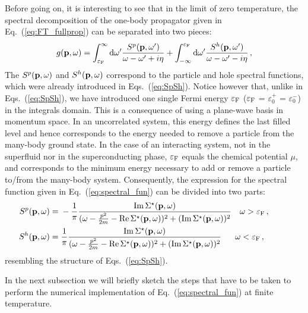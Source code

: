 Before going on, it is interesting to see that in the limit of zero temperature, the spectral decomposition of the one-body propagator given in Eq.~(\ref{eq:FT_fullprop}) can be separated into two pieces:
\begin{equation}
g({\bf p},\omega)=\int_{\varepsilon_\textrm F}^\infty\mathrm d\omega'\frac{S^p({\bf p},\omega')}{\omega-\omega'+i\eta}
+\int_{-\infty}^{\varepsilon_\textrm F}\mathrm d\omega'\frac{S^h({\bf p},\omega')}{\omega-\omega'-i\eta}\,,
\label{eq:Lehm_infty}
\end{equation}
The $S^p({\bf p},\omega)$ and $S^h({\bf p},\omega)$ correspond to the particle and hole spectral functions, which were already introduced in Eqs.~(\ref{eq:SpSh}). Notice however that, unlike in Eqs.~(\ref{eq:SpSh}), we have introduced one single Fermi energy $\varepsilon_\textrm F$ ($\varepsilon_\textrm F$ = $\varepsilon_0^+$ = $\varepsilon_0^-$) in the integrals domain. This is a consequence of using a plane-wave basis in momentum space. In an uncorrelated system, this energy defines the last filled level and hence corresponds to the energy needed to remove a particle from the many-body ground state. In the case of an interacting system, not in the superfluid nor in the superconducting phase, $\varepsilon_\textrm F$ equals the chemical potential $\mu$, and corresponds to the minimum energy necessary to add or remove a particle to/from the many-body system. Consequently, the expression for the spectral function given in Eq.~(\ref{eq:spectral_fun}) can be divided into two parts:
\begin{subequations}
\label{eq:S_self_all}
\begin{align}
S^p({\bf p},\omega)={}&-\frac{1}{\pi}\frac{\mathrm{Im} \, \Sigma^\star({\bf p},\omega)}
{(\omega-\frac{p^2}{2m}-\mathrm{Re} \, \Sigma^\star({\bf p},\omega))^2+(\rm{Im} \, \Sigma^\star({\bf p},\omega))^2} \quad \omega>\varepsilon_\textrm F\,,\qquad\,\,\,
\label{eq:Sp_self}
\\ 
S^h({\bf p},\omega)={}&\frac{1}{\pi}\frac{\mathrm{Im} \, \Sigma^\star({\bf p},\omega)}
{(\omega-\frac{p^2}{2m}-\mathrm{Re} \, \Sigma^\star({\bf p},\omega))^2+(\rm{Im} \, \Sigma^\star({\bf p},\omega))^2} \quad\,\,\,\, \omega<\varepsilon_\textrm F\,,\quad
\label{eq:Sh_self}
\end{align}
\end{subequations}
resembling the structure of Eqs.~(\ref{eq:SpSh}).

In the next subsection we will briefly sketch the steps that have to be taken to perform the numerical implementation of Eq.~(\ref{eq:spectral_fun}) at finite temperature.


